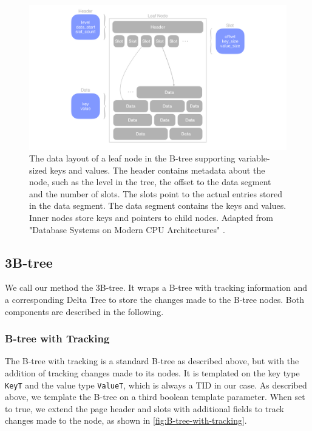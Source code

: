 \begin{figure}[htbp]
  \centering
  \includegraphics[width=1\textwidth]{figures/leaf_node.pdf}
  \caption{The data layout of a leaf node in the B-tree supporting variable-sized keys and values. The header contains metadata about the node, such as the level in the tree, the offset to the data segment and the number of slots. The slots point to the actual entries stored in the data segment. The data segment contains the keys and values. Inner nodes store keys and pointers to child nodes. Adapted from "Database Systems on Modern CPU Architectures" \autocite{mdbs2024slides}.}
  \label{fig:leaf-node}
\end{figure}

\subsection*{3B-tree}
\label{sec:3b-tree-implementation}

We call our method the 3B-tree. 
It wraps a B-tree with tracking information and a corresponding Delta Tree to store the changes made to the B-tree nodes.
Both components are described in the following.

\subsubsection*{B-tree with Tracking}
\label{sec:b-tree-with-tracking}
The B-tree with tracking is a standard B-tree as described above, but with the addition of tracking changes made to its nodes.
It is templated on the key type \texttt{KeyT} and the value type \texttt{ValueT}, which is always a \ac{TID} in our case.
As described above, we template the B-tree on a third boolean template parameter.
When set to true, we extend the page header and slots with additional fields to track changes made to the node, as shown in \autoref{fig:B-tree-with-tracking}.

